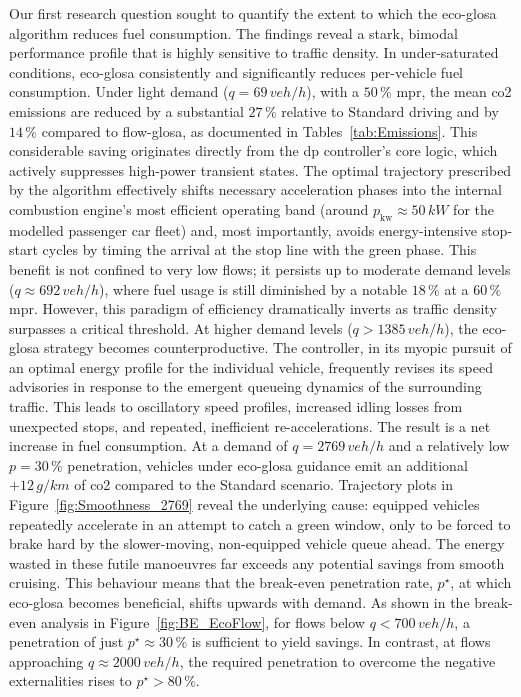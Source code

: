 Our first research question sought to quantify the extent to which the \ac{eco-glosa} algorithm reduces fuel consumption. The findings reveal a stark, bimodal performance profile that is highly sensitive to traffic density.
\mynewline
In under-saturated conditions, \ac{eco-glosa} consistently and significantly reduces per-vehicle fuel consumption. Under light demand ($q=69\,\unit{veh/h}$), with a $50\,\%$ \ac{mpr}, the mean \ac{co2} emissions are reduced by a substantial $27\,\%$ relative to Standard driving and by $14\,\%$ compared to \ac{flow-glosa}, as documented in Tables~\ref{tab:Emissions}. This considerable saving originates directly from the \ac{dp} controller's core logic, which actively suppresses high-power transient states. The optimal trajectory prescribed by the algorithm effectively shifts necessary acceleration phases into the internal combustion engine's most efficient operating band (around $p_\mathrm{kw}\approx50\,\unit{kW}$ for the modelled passenger car fleet) and, most importantly, avoids energy-intensive stop-start cycles by timing the arrival at the stop line with the green phase. This benefit is not confined to very low flows; it persists up to moderate demand levels ($q\approx692\,\unit{veh/h}$), where fuel usage is still diminished by a notable $18\,\%$ at a $60\,\%$ \ac{mpr}.
\mynewline
However, this paradigm of efficiency dramatically inverts as traffic density surpasses a critical threshold. At higher demand levels ($q > 1385\,\unit{veh/h}$), the \ac{eco-glosa} strategy becomes counterproductive. The controller, in its myopic pursuit of an optimal energy profile for the individual vehicle, frequently revises its speed advisories in response to the emergent queueing dynamics of the surrounding traffic. This leads to oscillatory speed profiles, increased idling losses from unexpected stops, and repeated, inefficient re-accelerations. The result is a net increase in fuel consumption. At a demand of $q=2769\,\unit{veh/h}$ and a relatively low $p=30\,\%$ penetration, vehicles under \ac{eco-glosa} guidance emit an additional $+12\,\unit{g/km}$ of \ac{co2} compared to the Standard scenario. Trajectory plots in Figure~\ref{fig:Smoothness_2769} reveal the underlying cause: equipped vehicles repeatedly accelerate in an attempt to catch a green window, only to be forced to brake hard by the slower-moving, non-equipped vehicle queue ahead. The energy wasted in these futile manoeuvres far exceeds any potential savings from smooth cruising.
\mynewline
This behaviour means that the break-even penetration rate, $p^\star$, at which \ac{eco-glosa} becomes beneficial, shifts upwards with demand. As shown in the break-even analysis in Figure~\ref{fig:BE_EcoFlow}, for flows below $q < 700\,\unit{veh/h}$, a penetration of just $p^\star\approx30\,\%$ is sufficient to yield savings. In contrast, at flows approaching $q \approx 2000\,\unit{veh/h}$, the required penetration to overcome the negative externalities rises to $p^\star > 80\,\%$.
